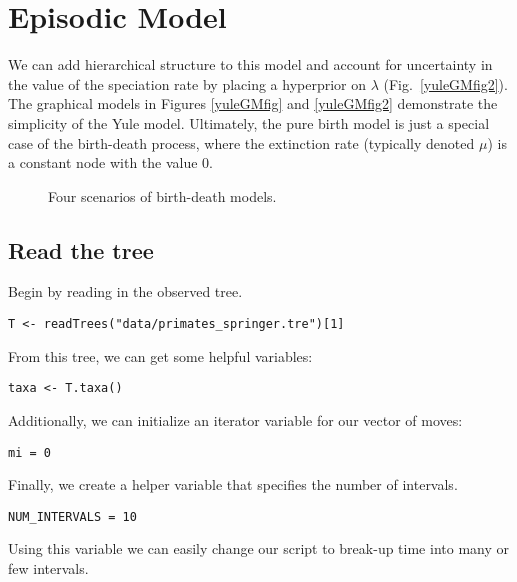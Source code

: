 

\bigskip
\section{Episodic Model}\label{yuleModSec}


We can add hierarchical structure to this model and account for uncertainty in the value of the speciation rate by placing a hyperprior on $\lambda$ (Fig.~\ref{yuleGMfig2}). 
The graphical models in Figures \ref{yuleGMfig} and \ref{yuleGMfig2} demonstrate the simplicity of the Yule model. 
Ultimately, the pure birth model is just a special case of the birth-death process, where the extinction rate (typically denoted $\mu$) is a constant node with the value 0. 
\begin{figure}[h!]
\centering
{}
\caption{\small Four scenarios of birth-death models.}
\label{fig:EBD}
\end{figure}



\subsection{Read the tree}

Begin by reading in the observed tree. 

{\tt \begin{snugshade*}
\begin{lstlisting}
T <- readTrees("data/primates_springer.tre")[1]
\end{lstlisting}
\end{snugshade*}}

From this tree, we can get some helpful variables:
{\tt \begin{snugshade*}
\begin{lstlisting}
taxa <- T.taxa()
\end{lstlisting}
\end{snugshade*}}

Additionally, we can initialize an iterator variable for our vector of moves:
{\tt \begin{snugshade*}
\begin{lstlisting}
mi = 0
\end{lstlisting}
\end{snugshade*}}

Finally, we create a helper variable that specifies the number of intervals.
{\tt \begin{snugshade*}
\begin{lstlisting}
NUM_INTERVALS = 10
\end{lstlisting}
\end{snugshade*}}
Using this variable we can easily change our script to break-up time into many or few intervals.



